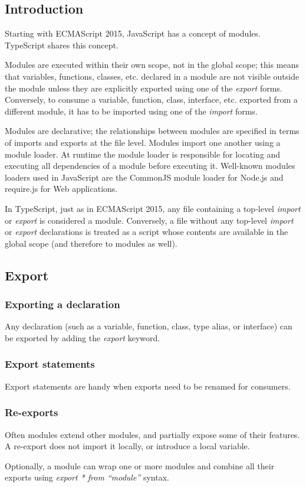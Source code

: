 \documentclass[a4paper]{report}
\begin{document}
\subsection{Introduction}
Starting with ECMAScript 2015, JavaScript has a concept of modules. TypeScript shares this concept.
\par
Modules are executed within their own scope, not in the global scope; this means that variables, functions, classes, etc. declared in a module are not visible outside the module unless they are explicitly exported using one of the \emph{export} forms. Conversely, to consume a variable, function, class, interface, etc. exported from a different module, it has to be imported using one of the \emph{import} forms.
\par
Modules are declarative; the relationships between modules are specified in terms of imports and exports at the file level.
Modules import one another using a module loader. At runtime the module loader is responsible for locating and executing all dependencies of a module before executing it. Well-known modules loaders used in JavaScript are the CommonJS module loader for Node.js and require.js for Web applications.
\par
In TypeScript, just as in ECMAScript 2015, any file containing a top-level \emph{import} or \emph{export} is considered a module. Conversely, a file without any top-level \emph{import} or \emph{export} declarations is treated as a script whose contents are available in the global scope (and therefore to modules as well).
\subsection{Export}
\subsubsection{Exporting a declaration}
Any declaration (such as a variable, function, class, type alias, or interface) can be exported by adding the \emph{export} keyword.
\subsubsection{Export statements}
Export statements are handy when exports need to be renamed for consumers.
\subsubsection{Re-exports}
Often modules extend other modules, and partially expose some of their features. A re-export does not import it locally, or introduce a local variable.
\par
Optionally, a module can wrap one or more modules and combine all their exports using \emph{export * from ``module''} syntax.
\end{document}
